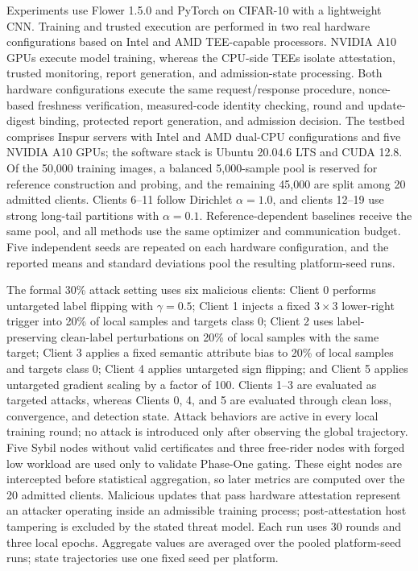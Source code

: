 \documentclass[runningheads,orivec]{llncs}
\begin{document}
Experiments use Flower 1.5.0 and PyTorch on CIFAR-10 with a lightweight CNN. Training and trusted execution are performed in two real hardware configurations based on Intel and AMD TEE-capable processors. NVIDIA A10 GPUs execute model training, whereas the CPU-side TEEs isolate attestation, trusted monitoring, report generation, and admission-state processing. Both hardware configurations execute the same request/response procedure, nonce-based freshness verification, measured-code identity checking, round and update-digest binding, protected report generation, and admission decision. The testbed comprises Inspur servers with Intel and AMD dual-CPU configurations and five NVIDIA A10 GPUs; the software stack is Ubuntu 20.04.6 LTS and CUDA 12.8. Of the 50,000 training images, a balanced 5,000-sample pool is reserved for reference construction and probing, and the remaining 45,000 are split among 20 admitted clients. Clients 6--11 follow Dirichlet $\alpha=1.0$, and clients 12--19 use strong long-tail partitions with $\alpha=0.1$. Reference-dependent baselines receive the same pool, and all methods use the same optimizer and communication budget. Five independent seeds are repeated on each hardware configuration, and the reported means and standard deviations pool the resulting platform-seed runs.

The formal 30\% attack setting uses six malicious clients: Client 0 performs untargeted label flipping with $\gamma=0.5$; Client 1 injects a fixed $3\times3$ lower-right trigger into 20\% of local samples and targets class 0; Client 2 uses label-preserving clean-label perturbations on 20\% of local samples with the same target; Client 3 applies a fixed semantic attribute bias to 20\% of local samples and targets class 0; Client 4 applies untargeted sign flipping; and Client 5 applies untargeted gradient scaling by a factor of 100. Clients 1--3 are evaluated as targeted attacks, whereas Clients 0, 4, and 5 are evaluated through clean loss, convergence, and detection state. Attack behaviors are active in every local training round; no attack is introduced only after observing the global trajectory. Five Sybil nodes without valid certificates and three free-rider nodes with forged low workload are used only to validate Phase-One gating. These eight nodes are intercepted before statistical aggregation, so later metrics are computed over the 20 admitted clients. Malicious updates that pass hardware attestation represent an attacker operating inside an admissible training process; post-attestation host tampering is excluded by the stated threat model. Each run uses 30 rounds and three local epochs. Aggregate values are averaged over the pooled platform-seed runs; state trajectories use one fixed seed per platform.
\end{document}
